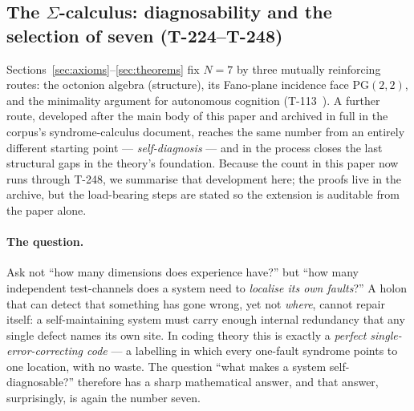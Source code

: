 \subsection{The \texorpdfstring{$\Sigma$}{Sigma}-calculus: diagnosability and the selection of seven (T-224--T-248)}
\label{subsec:sigma-calculus}

Sections~\ref{sec:axioms}--\ref{sec:theorems} fix $N = 7$ by three mutually
reinforcing routes: the octonion algebra (structure), its Fano-plane incidence
face $\mathrm{PG}(2,2)$, and the minimality argument for autonomous cognition
(T-113~). A further route, developed after the main body of this paper
and archived in full in the corpus's syndrome-calculus document, reaches the same
number from an entirely different starting point --- \emph{self-diagnosis} --- and
in the process closes the last structural gaps in the theory's foundation. Because
the count in this paper now runs through T-248, we summarise that development here;
the proofs live in the archive, but the load-bearing steps are stated so the
extension is auditable from the paper alone.

\paragraph{The question.}
Ask not ``how many dimensions does experience have?'' but ``how many independent
test-channels does a system need to \emph{localise its own faults}?'' A holon that
can detect that something has gone wrong, yet not \emph{where}, cannot repair
itself: a self-maintaining system must carry enough internal redundancy that any
single defect names its own site. In coding theory this is exactly a \emph{perfect
single-error-correcting code} --- a labelling in which every one-fault syndrome
points to one location, with no waste. The question ``what makes a system
self-diagnosable?'' therefore has a sharp mathematical answer, and that answer,
surprisingly, is again the number seven.

